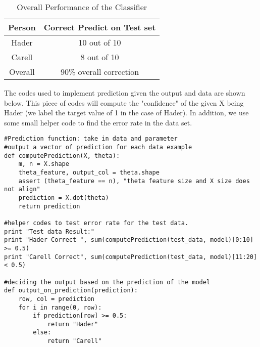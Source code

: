 \documentclass{article}
\begin{document}
\begin{part3}
\begin{table}[h!]
\centering
\begin{tabular}{||c c||} 
 \hline
 Person & Correct Predict on Test set \\ [0.5ex] 
 \hline\hline
 Hader & 10 out of 10  \\ 
 Carell & 8 out of 10  \\ 
 Overall & 90\% overall correction \\[1ex] 
 \hline
\end{tabular}
\caption{Overall Performance of the Classifier}
\label{table:1}
\end{table}

The codes used to implement prediction given the output and data are shown below. This piece of codes will compute the "confidence" of the given X being Hader (we label the target value of 1 in the case of Hader). In addition, we use some small helper code to find the error rate in the data set.

\newpage
\begin{verbatim}
#Prediction function: take in data and parameter
#output a vector of prediction for each data example
def computePrediction(X, theta):
    m, n = X.shape
    theta_feature, output_col = theta.shape
    assert (theta_feature == n), "theta feature size and X size does not align"
    prediction = X.dot(theta)
    return prediction

#helper codes to test error rate for the test data.    
print "Test data Result:"
print "Hader Correct ", sum(computePrediction(test_data, model)[0:10] >= 0.5)
print "Carell Correct", sum(computePrediction(test_data, model)[11:20] < 0.5)

#deciding the output based on the prediction of the model
def output_on_prediction(prediction):
    row, col = prediction
    for i in range(0, row):
        if prediction[row] >= 0.5:
            return "Hader"
        else:
            return "Carell"
\end{verbatim}


\end{part3}
\end{document}
